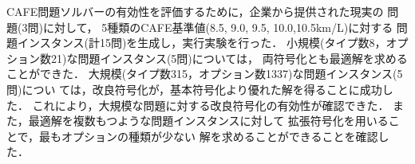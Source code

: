 CAFE問題ソルバーの有効性を評価するために，企業から提供された現実の
問題(3問)に対して，
5種類のCAFE基準値(8.5, 9.0, 9.5, 10.0,10.5km/L)に対する
問題インスタンス(計15問)を生成し，実行実験を行った．
%
小規模(タイプ数8，オプション数21)な問題インスタンス(5問)については，
両符号化とも最適解を求めることができた．
大規模(タイプ数315，オプション数1337)な問題インスタンス(5問)につい
ては，改良符号化が，基本符号化より優れた解を得ることに成功した．
これにより，大規模な問題に対する改良符号化の有効性が確認できた．
また，最適解を複数もつような問題インスタンスに対して
拡張符号化を用いることで，最もオプションの種類が少ない
解を求めることができることを確認した．

